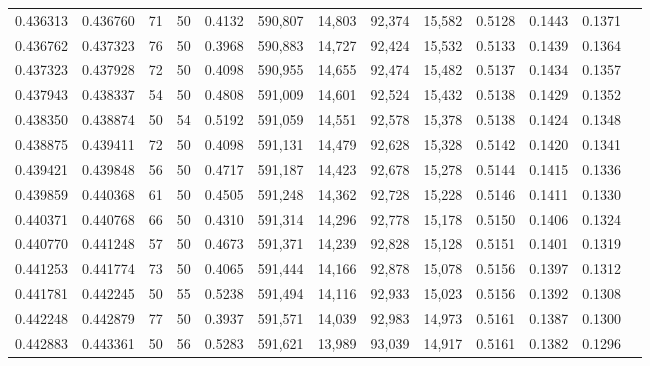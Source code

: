 \begin{tabular}{rrrrrrrrrrrrr}
0.436313 & 0.436760 &    71 &  50 &                                     0.4132 & 590,807 &  14,803 &  92,374 &  15,582 & 0.5128 & 0.1443 & 0.1371 \\
0.436762 & 0.437323 &    76 &  50 &                                     0.3968 & 590,883 &  14,727 &  92,424 &  15,532 & 0.5133 & 0.1439 & 0.1364 \\
0.437323 & 0.437928 &    72 &  50 &                                     0.4098 & 590,955 &  14,655 &  92,474 &  15,482 & 0.5137 & 0.1434 & 0.1357 \\
0.437943 & 0.438337 &    54 &  50 &                                     0.4808 & 591,009 &  14,601 &  92,524 &  15,432 & 0.5138 & 0.1429 & 0.1352 \\
0.438350 & 0.438874 &    50 &  54 &                                     0.5192 & 591,059 &  14,551 &  92,578 &  15,378 & 0.5138 & 0.1424 & 0.1348 \\
0.438875 & 0.439411 &    72 &  50 &                                     0.4098 & 591,131 &  14,479 &  92,628 &  15,328 & 0.5142 & 0.1420 & 0.1341 \\
0.439421 & 0.439848 &    56 &  50 &                                     0.4717 & 591,187 &  14,423 &  92,678 &  15,278 & 0.5144 & 0.1415 & 0.1336 \\
0.439859 & 0.440368 &    61 &  50 &                                     0.4505 & 591,248 &  14,362 &  92,728 &  15,228 & 0.5146 & 0.1411 & 0.1330 \\
0.440371 & 0.440768 &    66 &  50 &                                     0.4310 & 591,314 &  14,296 &  92,778 &  15,178 & 0.5150 & 0.1406 & 0.1324 \\
0.440770 & 0.441248 &    57 &  50 &                                     0.4673 & 591,371 &  14,239 &  92,828 &  15,128 & 0.5151 & 0.1401 & 0.1319 \\
0.441253 & 0.441774 &    73 &  50 &                                     0.4065 & 591,444 &  14,166 &  92,878 &  15,078 & 0.5156 & 0.1397 & 0.1312 \\
0.441781 & 0.442245 &    50 &  55 &                                     0.5238 & 591,494 &  14,116 &  92,933 &  15,023 & 0.5156 & 0.1392 & 0.1308 \\
0.442248 & 0.442879 &    77 &  50 &                                     0.3937 & 591,571 &  14,039 &  92,983 &  14,973 & 0.5161 & 0.1387 & 0.1300 \\
0.442883 & 0.443361 &    50 &  56 &                                     0.5283 & 591,621 &  13,989 &  93,039 &  14,917 & 0.5161 & 0.1382 & 0.1296 \\

\end{tabular}

